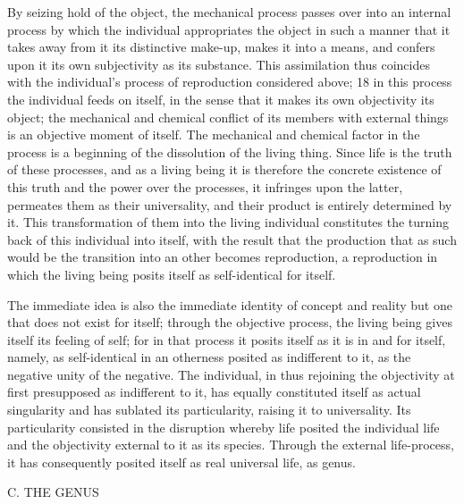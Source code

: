 By seizing hold of the object, the mechanical process passes over into
an internal process by which the individual appropriates the object in such
a manner that it takes away from it its distinctive make-up, makes it into
a means, and confers upon it its own subjectivity as its substance. This
assimilation thus coincides with the individual's process of reproduction
considered above; 18 in this process the individual feeds on itself, in the sense
that it makes its own objectivity its object; the mechanical and chemical
conflict of its members with external things is an objective moment of
itself. The mechanical and chemical factor in the process is a beginning of
the dissolution of the living thing. Since life is the truth of these processes,
and as a living being it is therefore the concrete existence of this truth and
the power over the processes, it infringes upon the latter, permeates them
as their universality, and their product is entirely determined by it. This
transformation of them into the living individual constitutes the turning
back of this individual into itself, with the result that the production that
as such would be the transition into an other becomes reproduction, a
reproduction in which the living being posits itself as self-identical for
itself.

The immediate idea is also the immediate identity of concept and reality
but one that does not exist for itself; through the objective process, the
living being gives itself its feeling of self; for in that process it posits itself
as it is in and for itself, namely, as self-identical in an otherness posited as
indifferent to it, as the negative unity of the negative. The individual, in thus
rejoining the objectivity at first presupposed as indifferent to it, has equally
constituted itself as actual singularity and has sublated its particularity,
raising it to universality. Its particularity consisted in the disruption whereby
life posited the individual life and the objectivity external to it as its species.
Through the external life-process, it has consequently posited itself as real
universal life, as genus.

C. THE GENUS

